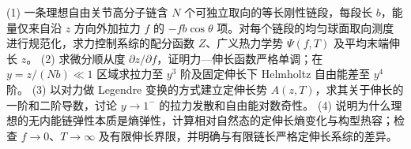 (1) 一条理想自由关节高分子链含 \(N\) 个可独立取向的等长刚性链段，每段长 \(b\)，能量仅来自沿 \(z\) 方向外加拉力 \(f\) 的 \(-fb\cos\theta\) 项。对每个链段的均匀球面取向测度进行规范化，求力控制系综的配分函数 \(Z\)、广义热力学势 \(\Psi(f,T)\) 及平均末端伸长 \(z\)。
(2) 求微分顺从度 \(\partial z/\partial f\)，证明力—伸长函数严格单调；在 \(y=z/(Nb)\ll1\) 区域求拉力至 \(y^3\) 阶及固定伸长下 Helmholtz 自由能差至 \(y^4\) 阶。
(3) 以对力做 Legendre 变换的方式建立定伸长势 \(A(z,T)\)，求其关于伸长的一阶和二阶导数，讨论 \(y\to1^-\) 的拉力发散和自由能对数奇性。
(4) 说明为什么理想的无内能链弹性本质是熵弹性，计算相对自然态的定伸长熵变化与构型热容；检查 \(f\to0\)、\(T\to\infty\) 及有限伸长界限，并明确与有限链长严格定伸长系综的差异。
